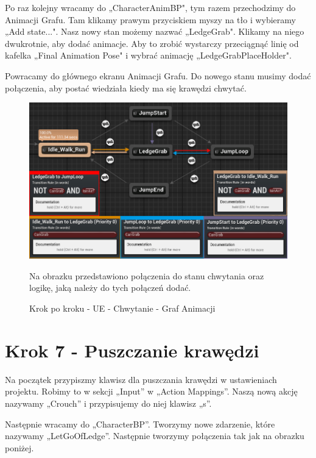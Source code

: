\documentclass[12pt]{xmgr}
\begin{document}
\newpage
Po raz kolejny wracamy do „CharacterAnimBP", tym razem przechodzimy do Animacji Grafu. Tam klikamy prawym przyciskiem myszy na tło i wybieramy „Add state...". Nasz nowy stan możemy nazwać „LedgeGrab". Klikamy na niego dwukrotnie, aby dodać animacje. Aby to zrobić wystarczy przeciągnąć linię od kafelka „Final Animation Pose" i wybrać animację „LedgeGrabPlaceHolder".

Powracamy do głównego ekranu Animacji Grafu. Do nowego stanu musimy dodać połączenia, aby postać wiedziała kiedy ma się krawędzi chwytać.

\begin{figure}[!htb]
    \begin{center}
    \includegraphics[scale=0.5]{Screeny/UeKrokPoKroku/UE-AnimGraph}
    \end{center}
    \caption{Krok po kroku - UE - Chwytanie - Graf Animacji}
    Na obrazku przedstawiono połączenia do stanu chwytania oraz logikę, jaką należy do tych połączeń dodać.
\end{figure}

\newpage

\section{Krok 7 - Puszczanie krawędzi}

Na początek przypiszmy klawisz dla puszczania krawędzi w ustawieniach projektu. Robimy to w sekcji „Input” w „Action Mappings”. Naszą nową akcję nazywamy „Crouch” i przypisujemy do niej klawisz „s”.

Następnie wracamy do „CharacterBP”. Tworzymy nowe zdarzenie, które nazywamy „LetGoOfLedge”. Następnie tworzymy połączenia tak jak na obrazku poniżej.
\end{document}
